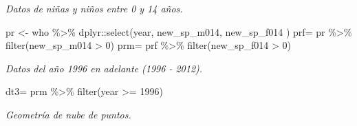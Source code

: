 \documentclass[
]{article}
\newenvironment{Shaded}{\begin{snugshade}}{\end{snugshade}}
\newcommand{\DecValTok}[1]{\textcolor[rgb]{0.00,0.00,0.81}{#1}}
\newcommand{\FunctionTok}[1]{\textcolor[rgb]{0.00,0.00,0.00}{#1}}
\newcommand{\NormalTok}[1]{#1}
\newcommand{\OtherTok}[1]{\textcolor[rgb]{0.56,0.35,0.01}{#1}}
\newcommand{\SpecialCharTok}[1]{\textcolor[rgb]{0.00,0.00,0.00}{#1}}
\begin{document}
\emph{Datos de niñas y niños entre 0 y 14 años.}

\begin{Shaded}
\begin{Highlighting}[]
\NormalTok{pr }\OtherTok{\textless{}{-}}\NormalTok{ who }\SpecialCharTok{\%\textgreater{}\%}\NormalTok{ dplyr}\SpecialCharTok{::}\FunctionTok{select}\NormalTok{(year, new\_sp\_m014, new\_sp\_f014 )}
\NormalTok{prf}\OtherTok{=}\NormalTok{ pr }\SpecialCharTok{\%\textgreater{}\%} \FunctionTok{filter}\NormalTok{(new\_sp\_m014 }\SpecialCharTok{\textgreater{}} \DecValTok{0}\NormalTok{)}
\NormalTok{prm}\OtherTok{=}\NormalTok{ prf }\SpecialCharTok{\%\textgreater{}\%} \FunctionTok{filter}\NormalTok{(new\_sp\_f014 }\SpecialCharTok{\textgreater{}} \DecValTok{0}\NormalTok{)}
\end{Highlighting}
\end{Shaded}

\emph{Datos del año 1996 en adelante (1996 - 2012).}

\begin{Shaded}
\begin{Highlighting}[]
\NormalTok{dt3}\OtherTok{=}\NormalTok{ prm }\SpecialCharTok{\%\textgreater{}\%} \FunctionTok{filter}\NormalTok{(year }\SpecialCharTok{\textgreater{}=} \DecValTok{1996}\NormalTok{)}
\end{Highlighting}
\end{Shaded}

\emph{Geometría de nube de puntos.}
\end{document}

